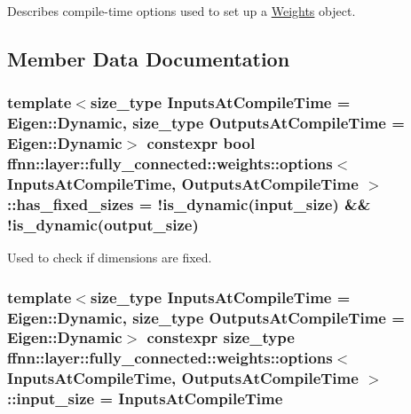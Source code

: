 Describes compile-\/time options used to set up a \hyperlink{classffnn_1_1layer_1_1fully__connected_1_1_weights}{Weights} object. 

\subsection{Member Data Documentation}
\hypertarget{structffnn_1_1layer_1_1fully__connected_1_1weights_1_1options_acb66c282ebaa5f29ce34d14b68551b94}{
\subsubsection[{has\-\_\-fixed\-\_\-sizes}]{\setlength{\rightskip}{0pt plus 5cm}template$<$size\-\_\-type Inputs\-At\-Compile\-Time = Eigen\-::\-Dynamic, size\-\_\-type Outputs\-At\-Compile\-Time = Eigen\-::\-Dynamic$>$ constexpr bool {\bf ffnn\-::layer\-::fully\-\_\-connected\-::weights\-::options}$<$ Inputs\-At\-Compile\-Time, Outputs\-At\-Compile\-Time $>$\-::has\-\_\-fixed\-\_\-sizes = !{\bf is\-\_\-dynamic}({\bf input\-\_\-size}) \&\& !{\bf is\-\_\-dynamic}({\bf output\-\_\-size})\hspace{0.3cm}{\ttfamily [static]}}}\label{structffnn_1_1layer_1_1fully__connected_1_1weights_1_1options_acb66c282ebaa5f29ce34d14b68551b94}


Used to check if dimensions are fixed. 

\hypertarget{structffnn_1_1layer_1_1fully__connected_1_1weights_1_1options_aa9973b3dcef51f2684f3c36bbeccd767}{
\subsubsection[{input\-\_\-size}]{\setlength{\rightskip}{0pt plus 5cm}template$<$size\-\_\-type Inputs\-At\-Compile\-Time = Eigen\-::\-Dynamic, size\-\_\-type Outputs\-At\-Compile\-Time = Eigen\-::\-Dynamic$>$ constexpr {\bf size\-\_\-type} {\bf ffnn\-::layer\-::fully\-\_\-connected\-::weights\-::options}$<$ Inputs\-At\-Compile\-Time, Outputs\-At\-Compile\-Time $>$\-::input\-\_\-size = Inputs\-At\-Compile\-Time\hspace{0.3cm}{\ttfamily [static]}}}\label{structffnn_1_1layer_1_1fully__connected_1_1weights_1_1options_aa9973b3dcef51f2684f3c36bbeccd767}


